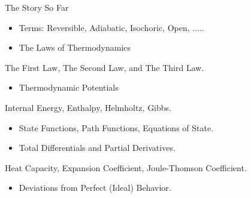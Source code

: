 \documentclass[t,10pt,mathserif,xcolor=pst,pdftex]{beamer}
\begin{document}
\begin{frame}{The Story So Far}

\begin{itemize}
\item Terms: Reversible, Adiabatic, Isochoric, Open, ..... 
\end{itemize}

\begin{itemize}
\item The Laws of Thermodynamics
\end{itemize}
The First Law, The Second Law, and The Third Law.

\begin{itemize}
\item Thermodynamic Potentials
\end{itemize}
Internal Energy, Enthalpy, Helmholtz, Gibbs.

\begin{itemize}
\item State Functions, Path Functions, Equations of State. 
\end{itemize}

\begin{itemize}
\item Total Differentials and Partial Derivatives. 
\end{itemize}
Heat Capacity, Expansion Coefficient, Joule-Thomson Coefficient. 

\begin{itemize}
\item Deviations from Perfect (Ideal) Behavior. 
\end{itemize}

\end{frame}
\end{document}
